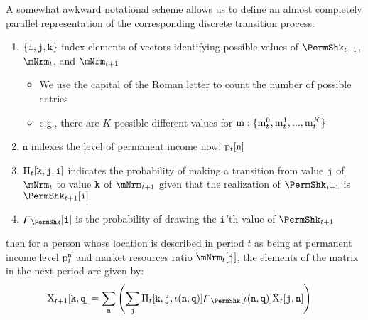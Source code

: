 \documentclass[\econtexRoot/BufferStockTheory]{subfiles}
\begin{document}
\newcommand{\nPermLvlVecNow}{\texttt{n}}\newcommand{\nPermLvlVecNxt}{\texttt{q}}\newcommand{\nPermShkNxtFunc}{\iota(\nPermLvlVecNow,\nPermLvlVecNxt)}\newcommand{\nPermShkVecNxt}{\texttt{i}}
\newcommand{\mNrmVecNow}{\mNrmVec_{t}^{\nmNrmVecNow}}
\newcommand{\mNrmVecNxt}{\mNrmVec_{t+1}^{\nmNrmVecNxt}}
\newcommand{\PermShkVecNxt}{\PermShk_{t+1}^{\nPermShkVecNxt}}
\newcommand{\PermShkVecNow}{\PermShk_{t}^{\nPermShkVecNow}}
\newcommand{\PermLvlNow}{\PermLvlPrb_{t}}
\newcommand{\PermLvlNxt}{\PermLvlPrb_{t+1}}
\newcommand{\PermLvlVecNow}{\PermLvlVec_{t}^{\nPermLvlVecNow}}
\newcommand{\PermLvlVecNxt}{\PermLvlVec_{t+1}^{\nPermLvlVecNxt}}

\noindent A somewhat awkward notational scheme allows us to define an almost completely parallel representation of the corresponding discrete transition process:
\begin{enumerate}
\item $\{\texttt{i}, \texttt{j}, \texttt{k}\}$ index elements of vectors identifying possible values of $\PermShkPrbNxt$, $\mNrmNow$, and $\mNrmNxt$
  \begin{itemize}
  \item We use the capital of the Roman letter to count the number of possible entries
    \item e.g., there are $K$ possible different values for $\mathrm{m}:\{\mathrm{m}_{t}^{0},\mathrm{m}_{t}^{1},...,\mathrm{m}_{t}^{K}\}$
    \end{itemize}
\item $\nPermLvlVecNow$ indexes the level of permanent income now: $\PermLvlVec_{t}[\nPermLvlVecNow]$
\item$\Pi_{t}[\texttt{k},\texttt{j},\texttt{i}]$ indicates the probability of making a transition from value $\texttt{j}$ of $\mNrmNow$ to value $\texttt{k}$ of $\mNrmNxt$ given that the realization of $\PermShkPrbNxt$ is $\PermShkPrbNxt[\nPermShk]$
\item $\PermShkVec[\nPermShk]$ is the probability of drawing the $\texttt{i}$'th value of $\PermShkPrbNxt$
\end{enumerate}
then for a person whose location is described in period $t$ as being at permanent income level $\PermLvlVecNow$ and market resources ratio $\mNrmNow[\nmNrmVecNow]$, the elements of the matrix in the next period are given by:
\begin{equation}\begin{aligned} \label{eq:mpMattp1}
  \mpMat_{t+1}[\nmNrmVecNxt,\nPermLvlVecNxt] & = \sum_{\nPermLvlVecNow} \left(\sum_{\nmNrmVecNow} \lomdkMat_{t}[\nmNrmVecNxt,\nmNrmVecNow,\nPermShkNxtFunc]\PermShkVec[\nPermShkNxtFunc]\mpMat_{t}[\nmNrmVecNow,\nPermLvlVecNow]  \right)
\end{aligned}\end{equation}
\end{document}
